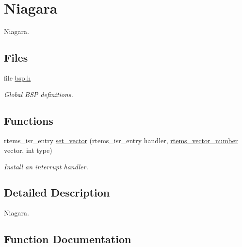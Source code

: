 \hypertarget{group__RTEMSBSPsSPARC64Niagara}{}\section{Niagara}
\label{group__RTEMSBSPsSPARC64Niagara}


Niagara.  


\subsection*{Files}
\begin{DoxyCompactItemize}
\item 
file \mbox{\hyperlink{bsps_2sparc64_2niagara_2include_2bsp_8h}{bsp.\+h}}
\begin{DoxyCompactList}\small\item\em Global B\+SP definitions. \end{DoxyCompactList}\end{DoxyCompactItemize}
\subsection*{Functions}
\begin{DoxyCompactItemize}
\item 
rtems\+\_\+isr\+\_\+entry \mbox{\hyperlink{group__RTEMSBSPsSPARC64Niagara_gab3388042c56b34c40be81fd5f028d97e}{set\+\_\+vector}} (rtems\+\_\+isr\+\_\+entry handler, \mbox{\hyperlink{group__ClassicINTR_ga3e434c197d99f128e78cae4d9358bd8b}{rtems\+\_\+vector\+\_\+number}} vector, int type)
\begin{DoxyCompactList}\small\item\em Install an interrupt handler. \end{DoxyCompactList}\end{DoxyCompactItemize}


\subsection{Detailed Description}
Niagara. 



\subsection{Function Documentation}
\mbox{\label{group__RTEMSBSPsSPARC64Niagara_gab3388042c56b34c40be81fd5f028d97e}} 
